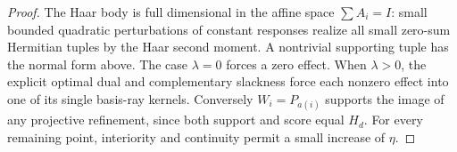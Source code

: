 \begin{proof}
The Haar body is full dimensional in the affine space \(\sum A_i=I\):
small bounded quadratic perturbations of constant responses realize
all small zero-sum Hermitian tuples by the Haar second moment.
A nontrivial supporting tuple has the normal form above.
The case \(\lambda=0\) forces a zero effect. When \(\lambda>0\),
the explicit optimal dual and complementary slackness force each
nonzero effect into one of its single basis-ray kernels.
Conversely \(W_i=P_{a(i)}\) supports the image of any projective
refinement, since both support and score equal \(H_d\).
For every remaining point, interiority and continuity permit a
small increase of \(\eta\).
\end{proof}


